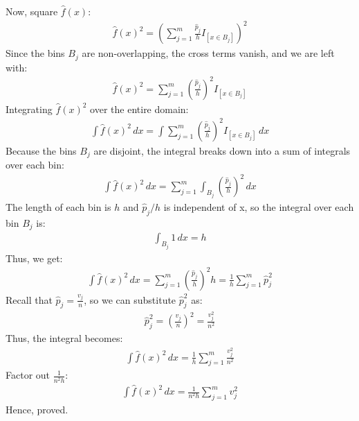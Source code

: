 Now, square \( \hat{f}(x) \):
\begin{align}
	\hat{f}(x)^2 = \left( \sum_{j=1}^{m} \frac{\hat{p}_j}{h} I_{[x \in B_j]} \right)^2
\end{align}
Since the bins \( B_j \) are non-overlapping, the cross terms vanish, and we are left with:
\begin{align}
	\hat{f}(x)^2 = \sum_{j=1}^{m} \left( \frac{\hat{p}_j}{h} \right)^2 I_{[x \in B_j]}
\end{align}
Integrating \( \hat{f}(x)^2 \) over the entire domain:
\begin{align}
	\int \hat{f}(x)^2 \, dx = \int \sum_{j=1}^{m} \left( \frac{\hat{p}_j}{h} \right)^2 I_{[x \in B_j]} \, dx
\end{align}
Because the bins \( B_j \) are disjoint, the integral breaks down into a sum of integrals over each bin:
\begin{align}
	\int \hat{f}(x)^2 \, dx = \sum_{j=1}^{m} \int_{B_j} \left( \frac{\hat{p}_j}{h} \right)^2 \, dx
\end{align}
The length of each bin is  $h$ and $ \hat{p}_{j}/h $ is independent of x, so the integral over each bin $B_j$  is:
\begin{align}
	\int_{B_j} 1 \, dx = h
\end{align}
Thus, we get:
\begin{align}
	\int \hat{f}(x)^2 \, dx = \sum_{j=1}^{m} \left( \frac{\hat{p}_j}{h} \right)^2 h = \frac{1}{h} \sum_{j=1}^{m} \hat{p}_j^2
\end{align}
Recall that \( \hat{p}_j = \frac{v_j}{n} \), so we can substitute \( \hat{p}_j^2 \) as:
\begin{align}
	\hat{p}_j^2 = \left( \frac{v_j}{n} \right)^2 = \frac{v_j^2}{n^2}
\end{align}
Thus, the integral becomes:
\begin{align}
	\int \hat{f}(x)^2 \, dx = \frac{1}{h} \sum_{j=1}^{m} \frac{v_j^2}{n^2}
\end{align}
Factor out \( \frac{1}{n^2 h} \):
\begin{align}
	\int \hat{f}(x)^2 \, dx = \frac{1}{n^2 h} \sum_{j=1}^{m} v_j^2
\end{align}
Hence, proved.

